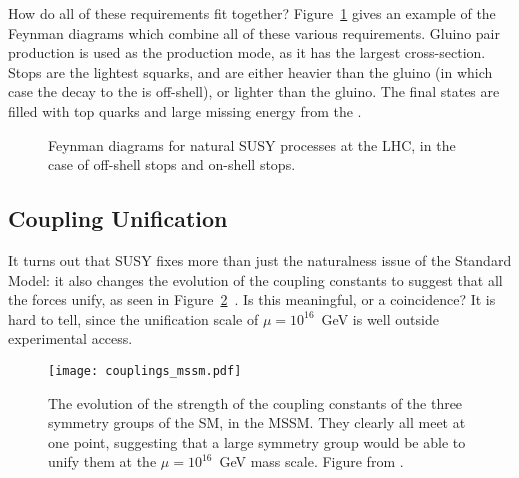 
How do all of these requirements fit together? Figure~\ref{fig:susy:gtt} gives an example of the Feynman diagrams which combine all of these various requirements. Gluino pair production is used as the production mode, as it has the largest cross-section. Stops are the lightest squarks, and are either heavier than the gluino (in which case the decay to the \lsp is off-shell), or lighter than the gluino. The final states are filled with top quarks and large missing energy from the \lsp.



\begin{figure}
\centering
{}
\label{fig:susy:gtt}
\caption{Feynman diagrams for natural SUSY processes at the LHC, in the case of off-shell stops and on-shell stops.}
\end{figure}






\subsection{Coupling Unification}


It turns out that SUSY fixes more than just the naturalness issue of the Standard Model: it also changes the evolution of the coupling constants to suggest that all the forces unify, as seen in Figure~\ref{fig:susy:couplings_mssm}~\cite{susypheno}. Is this meaningful, or a coincidence? It is hard to tell, since the unification scale of $\mu = 10^{16}$~GeV is well outside experimental access.


\begin{figure}
\centering
\texttt{[image: couplings\_mssm.pdf]}
\label{fig:susy:couplings_mssm}
\caption{The evolution of the strength of the coupling constants of the three symmetry groups of the SM, in the MSSM. They clearly all meet at one point, suggesting that a large symmetry group would be able to unify them at the $\mu = 10^{16}$~GeV mass scale. Figure from \cite{susypheno}.}
\end{figure}

